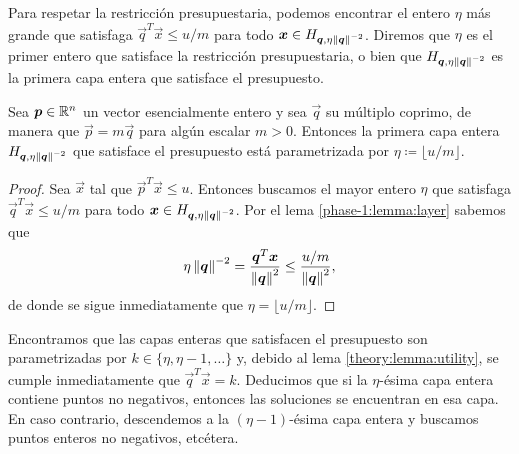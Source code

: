 Para respetar la restricción presupuestaria, podemos encontrar el entero $\eta$ más grande que
satisfaga $\vec{q}^T\vec{x} \leq u/m$ para todo $\boldsymbol{x} \in H_{\boldsymbol{q}, \eta\left\lVert \boldsymbol{q} \right\rVert^{-2}}$.
Diremos que $\eta$ es el primer entero que satisface la restricción presupuestaria, o bien que
$H_{\boldsymbol{q}, \eta\left\lVert \boldsymbol{q} \right\rVert^{-2}}$ es la primera capa entera que satisface el presupuesto.
\begin{lemma}
	\label{phase-1:lemma:eta}
	Sea $\boldsymbol{p} \in \mathbb{R}^n$ un vector esencialmente entero y sea $\vec{q}$ su múltiplo coprimo, de
	manera que $\vec{p} = m\vec{q}$ para algún escalar $m > 0$. Entonces la primera capa
	entera $H_{\boldsymbol{q}, \eta \left\lVert \boldsymbol{q} \right\rVert^{-2}}$ que satisface el presupuesto está parametrizada
	por $\eta \coloneq \lfloor u/m \rfloor$.
\end{lemma}
\begin{proof}
	Sea $\vec{x}$ tal que $\vec{p}^T\vec{x} \leq u$. Entonces buscamos el mayor entero $\eta$ que
	satisfaga $\vec{q}^T\vec{x} \leq u/m$ para todo $\boldsymbol{x} \in H_{\boldsymbol{q},
	\eta\left\lVert \boldsymbol{q} \right\rVert^{-2}}$. Por el lema \ref{phase-1:lemma:layer} sabemos que
	\begin{equation*}
		\eta\left\lVert \boldsymbol{q} \right\rVert^{-2} = \frac{\boldsymbol{q}^T\boldsymbol{x}}{\left\lVert \boldsymbol{q} \right\rVert^2} \leq
		\frac{u/m}{\left\lVert \boldsymbol{q} \right\rVert^2},
	\end{equation*}
	de donde se sigue inmediatamente que $\eta = \lfloor u/m \rfloor$.
\end{proof}

Encontramos que las capas enteras que satisfacen el presupuesto son parametrizadas por $k \in
\lbrace \eta, \eta - 1, \ldots \rbrace$ y, debido al lema \ref{theory:lemma:utility}, se cumple
inmediatamente que $\vec{q}^T\vec{x} = k$. Deducimos que si la $\eta$-ésima capa entera contiene
puntos no negativos, entonces las soluciones se encuentran en esa capa. En caso contrario,
descendemos a la $(\eta - 1)$-ésima capa entera y buscamos puntos enteros no negativos, etcétera.

